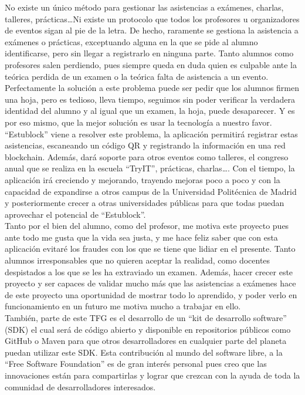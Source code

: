   No existe un único método para gestionar las asistencias a exámenes, charlas, talleres, prácticas\dots Ni existe un protocolo que todos los profesores u organizadores de eventos sigan al pie de la letra. De hecho, raramente se gestiona la asistencia a exámenes o prácticas, exceptuando alguna en la que se pide al alumno identificarse, pero sin llegar a registrarlo en ninguna parte. Tanto alumnos como profesores salen perdiendo, pues siempre queda en duda quien es culpable ante la teórica perdida de un examen o la teórica falta de asistencia a un evento. Perfectamente la solución a este problema puede ser pedir que los alumnos firmen una hoja, pero es tedioso, lleva tiempo, seguimos sin poder verificar la verdadera identidad del alumno y al igual que un examen, la hoja, puede desaparecer. Y es por eso mismo, que la mejor solución es usar la tecnología a nuestro favor. \\

``Estublock'' viene a resolver este problema, la aplicación permitirá registrar estas asistencias, escaneando un código QR y registrando la información en una red blockchain. Además, dará soporte para otros eventos como talleres, el congreso anual que se realiza en la escuela ``TryIT'', prácticas, charlas\dots. Con el tiempo, la aplicación irá creciendo y mejorando, trayendo mejoras poco a poco y con la capacidad de expandirse a otros campus de la Universidad Politécnica de Madrid y posteriormente crecer a otras universidades públicas para que todas puedan aprovechar el potencial de ``Estublock''. \\

Tanto por el bien del alumno, como del profesor, me motiva este proyecto pues ante todo me gusta que la vida sea justa, y me hace feliz saber que con esta aplicación evitaré los fraudes con los que se tiene que lidiar en el presente. Tanto alumnos irresponsables que no quieren aceptar la realidad, como docentes despistados a los que se les ha extraviado un examen. Además, hacer crecer este proyecto y ser capaces de validar mucho más que las asistencias a exámenes hace de este proyecto una oportunidad de mostrar todo lo aprendido, y poder verlo en funcionamiento en un futuro me motiva mucho a trabajar en ello. \\

También, parte de este TFG es el desarrollo de un ``kit de desarrollo software'' (SDK) el cual será de código abierto y disponible en repositorios públicos como GitHub o Maven para que otros desarrolladores en cualquier parte del planeta puedan utilizar este SDK. Esta contribución al mundo del software libre, a la ``Free Software Foundation'' es de gran interés personal pues creo que las innovaciones están para compartirlas y lograr que crezcan con la ayuda de toda la comunidad de desarrolladores interesados. \\

